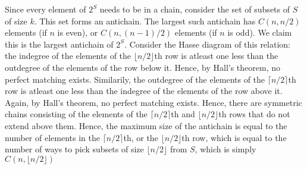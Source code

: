 \documentclass[12pt,answers]{exam}
\begin{document}
\begin{questions}
\begin{solution}
\begin{enumerate}
    {\item Since every element of $2^S$ needs to be in a chain, consider the set of subsets of $S$ of size $k$. This set forms an antichain. The largest such antichain has $C(n,n/2)$ elements (if $n$ is even), or $C(n,(n-1)/2)$ elements (if $n$ is odd). We claim this is the largest antichain of $2^S$. Consider the Hasse diagram of this relation: the indegree of the elements of the $\lfloor n/2 \rfloor$th row is atleast one less than the outdegree of the elements of the row below it. Hence, by Hall's theorem, no perfect matching exists. Similarily, the outdegree of the elements of the $\lceil n/2\rceil$th row is atleast one less than the indegree of the elements of the row above it. Again, by Hall's theorem, no perfect matching exists. Hence, there are symmetric chains consisting of the elements of the $\lceil n/2\rceil$th and $\lfloor n/2\rfloor$th rows that do not extend above them. Hence, the maximum size of the antichain is equal to the number of elements in the $\lceil n/2\rceil$th, or the $\lfloor n/2\rfloor$th row, which is equal to the number of ways to pick subsets of size $\lfloor n/2\rfloor$ from $S$, which is simply $\boxed{C(n,\lfloor n/2 \rfloor)}$}
\end{enumerate}
\end{solution}


\end{questions}
\end{document}
